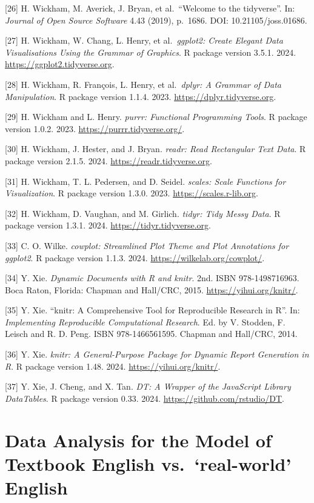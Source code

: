 \documentclass[
  letterpaper,
  DIV=11,
  numbers=noendperiod]{scrreprt}
\begin{document}
{[}26{]} H. Wickham, M. Averick, J. Bryan, et al.~``Welcome to the
tidyverse''. In: \emph{Journal of Open Source Software} 4.43 (2019),
p.~1686. DOI: 10.21105/joss.01686.

{[}27{]} H. Wickham, W. Chang, L. Henry, et al.~\emph{ggplot2: Create
Elegant Data Visualisations Using the Grammar of Graphics}. R package
version 3.5.1. 2024. \url{https://ggplot2.tidyverse.org}.

{[}28{]} H. Wickham, R. François, L. Henry, et al.~\emph{dplyr: A
Grammar of Data Manipulation}. R package version 1.1.4. 2023.
\url{https://dplyr.tidyverse.org}.

{[}29{]} H. Wickham and L. Henry. \emph{purrr: Functional Programming
Tools}. R package version 1.0.2. 2023.
\url{https://purrr.tidyverse.org/}.

{[}30{]} H. Wickham, J. Hester, and J. Bryan. \emph{readr: Read
Rectangular Text Data}. R package version 2.1.5. 2024.
\url{https://readr.tidyverse.org}.

{[}31{]} H. Wickham, T. L. Pedersen, and D. Seidel. \emph{scales: Scale
Functions for Visualization}. R package version 1.3.0. 2023.
\url{https://scales.r-lib.org}.

{[}32{]} H. Wickham, D. Vaughan, and M. Girlich. \emph{tidyr: Tidy Messy
Data}. R package version 1.3.1. 2024. \url{https://tidyr.tidyverse.org}.

{[}33{]} C. O. Wilke. \emph{cowplot: Streamlined Plot Theme and Plot
Annotations for ggplot2}. R package version 1.1.3. 2024.
\url{https://wilkelab.org/cowplot/}.

{[}34{]} Y. Xie. \emph{Dynamic Documents with R and knitr}. 2nd. ISBN
978-1498716963. Boca Raton, Florida: Chapman and Hall/CRC, 2015.
\url{https://yihui.org/knitr/}.

{[}35{]} Y. Xie. ``knitr: A Comprehensive Tool for Reproducible Research
in R''. In: \emph{Implementing Reproducible Computational Research}. Ed.
by V. Stodden, F. Leisch and R. D. Peng. ISBN 978-1466561595. Chapman
and Hall/CRC, 2014.

{[}36{]} Y. Xie. \emph{knitr: A General-Purpose Package for Dynamic
Report Generation in R}. R package version 1.48. 2024.
\url{https://yihui.org/knitr/}.

{[}37{]} Y. Xie, J. Cheng, and X. Tan. \emph{DT: A Wrapper of the
JavaScript Library DataTables}. R package version 0.33. 2024.
\url{https://github.com/rstudio/DT}.

\chapter{Data Analysis for the Model of Textbook English
vs.~`real-world'
English}\label{data-analysis-for-the-model-of-textbook-english-vs.-real-world-english}
\end{document}
